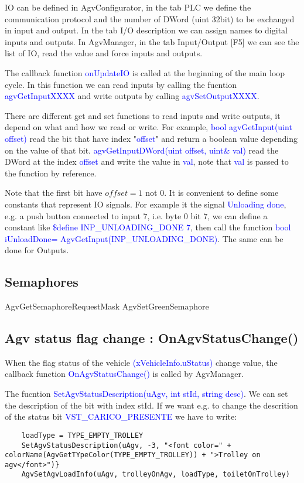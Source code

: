 IO can be defined in AgvConfigurator, in the tab PLC we define the communication protocol and the number of DWord (uint 32bit) to be exchanged in input and output. In the tab I/O description we can assign names to digital inputs and outputs.
In AgvManager, in the tab Input/Output [F5] we can see the list of IO, read the value and force inputs and outputs.

The callback function \textcolor{blue}{onUpdateIO} is called at the beginning of the main loop cycle. In this function we can read inputs by calling the fucntion \textcolor{blue}{agvGetInputXXXX} and write outputs by calling \textcolor{blue}{agvSetOutputXXXX}.

There are different get and set functions to read inputs and write outputs, it depend on what and how we read or write. For example, \textcolor{blue}{bool agvGetInput(uint offset)} read the bit that have index "\textcolor{blue}{offset}" and return a boolean value depending on the value of that bit. \textcolor{blue}{agvGetInputDWord(uint offset, uint\& val)} read the DWord at the index \textcolor{blue}{offset} and write the value in \textcolor{blue}{val}, note that \textcolor{blue}{val} is passed to the function by reference.

Note that the first bit have $offset = 1$ not $0$. It is convenient to define some constants that represent IO signals. For example it the signal \textcolor{blue}{Unloading done}, e.g. a push button connected to input 7, i.e. byte 0 bit 7, we can define a constant like \textcolor{blue}{\$define INP\_UNLOADING\_DONE 7}, then call the function \textcolor{blue}{bool iUnloadDone= AgvGetInput(INP\_UNLOADING\_DONE)}. The same can be done for Outputs.

\subsection{Semaphores}
AgvGetSemaphoreRequestMask
AgvSetGreenSemaphore

\subsection{Agv status flag change : OnAgvStatusChange() }
When the flag status of the vehicle \textcolor{blue}{(xVehicleInfo.uStatus)} change value, the callback function \textcolor{blue}{OnAgvStatusChange()} is called by AgvManager.

The fucntion \textcolor{blue}{SetAgvStatusDescription(uAgv, int stId, string desc)}. We can set the description of the bit with index stId.
If we want e.g. to change the descrition of the status bit \textcolor{blue}{VST\_CARICO\_PRESENTE} we have to write: 
\begin{lstlisting}
	loadType = TYPE_EMPTY_TROLLEY
	SetAgvStatusDescription(uAgv, -3, "<font color=" + colorName(AgvGetTYpeColor(TYPE_EMPTY_TROLLEY)) + ">Trolley on agv</font>")}
	AgvSetAgvLoadInfo(uAgv, trolleyOnAgv, loadType, toiletOnTrolley)
\end{lstlisting}

